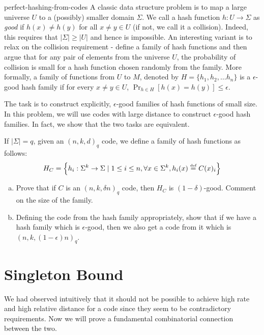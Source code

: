 \begin{exercise-prob}
\begin{show-ps5}{perfect-hashing-from-codes}
A classic data structure problem is to map a large universe $U$ to a (possibly) smaller domain $\Sigma$. We call a hash function $h:U \to \Sigma$ as \textit{good} if $h(x) \neq h(y)$ for all $x \neq y \in U$ (if not, we call it a collision). Indeed, this requires that $|\Sigma| \ge |U|$ and hence is impossible. An interesting variant is to relax on the collision requirement - define a family of hash functions and then argue that for any pair of elements from the universe $U$, the probability of collision is small for a hash function chosen randomly from the family. More formally, a family of functions from $U$ to $M$, denoted by $H=\{h_1, h_2, \ldots h_n \}$ is a $\epsilon$-good hash family if for every $x \ne y \in U$, $\Pr_{h \in H} [ h(x) = h(y) ] \le \epsilon$.

The task is to construct explicitly, $\epsilon$-good families of hash functions of small size. In this problem, we will use codes with large distance to construct $\epsilon$-good hash families. In fact, we show that the two tasks are equivalent.

If $|\Sigma|=q$, given an $(n,k,d)_q$ code, we define a family of hash functions as follows: 
$$H_C = \left\{ h_i : \Sigma^k \to \Sigma \mid 1\le i \le n, \forall x \in \Sigma^k, h_i(x) \stackrel{\text{\tiny def}}{=} C(x)_i \right\}$$

\begin{enumerate}[(a)]
\item Prove that if $C$ is an $(n,k,\delta n)_q$ code, then $H_C$ is $(1-\delta)$-good.
Comment on the size of the family.
\item Defining the code from the hash family appropriately, show that if we have a hash family which is $\epsilon$-good, then we also get a code from it which is $(n,k,(1-\epsilon)n)_q$.
\end{enumerate}
\end{show-ps5}
\end{exercise-prob}


\section{Singleton Bound}

We had observed intuitively that it should not be possible to achieve high rate and high relative distance for a code since they seem to be contradictory requirements. Now we will prove a fundamental combinatorial connection between the two.

